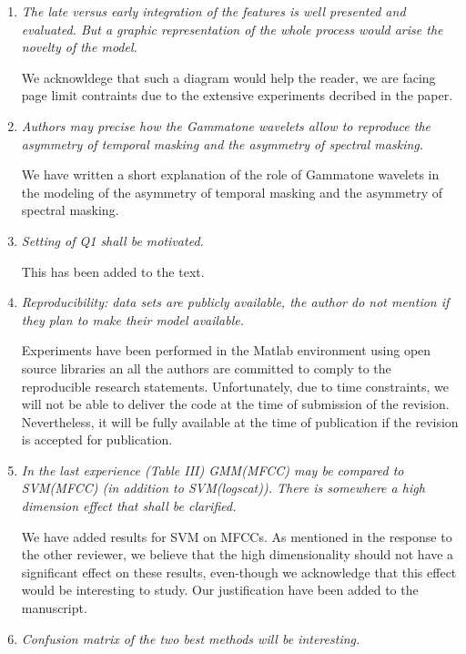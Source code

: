 \documentclass[10pt]{article}
\begin{document}
\begin{enumerate}

\item \emph{The late versus early integration of the features is well presented and evaluated. But a graphic representation of the whole process would arise the novelty of the model.}

We acknowldege that such a diagram would help the reader, we are facing page limit contraints due to the extensive experiments decribed in the paper.

\item \emph{Authors may precise how the Gammatone wavelets allow to reproduce the asymmetry of temporal masking and the asymmetry of spectral masking.}

We have written a short explanation of the role of Gammatone wavelets in the modeling of the asymmetry of temporal masking and the asymmetry of spectral masking.

\item \emph{Setting of Q1 shall be motivated.}

This has been added to the text.

\item \emph{Reproducibility:  data sets are publicly available, the author do not mention if they plan to make their model available.}

Experiments have been performed in the Matlab environment using open source libraries an all the authors are committed to comply to the reproducible research statements. Unfortunately, due to time constraints, we will not be able to deliver the code at the time of submission of the revision. Nevertheless, it will be fully available at the time of publication if the revision is accepted for publication.

\item \emph{In the last experience (Table III) GMM(MFCC) may be compared to SVM(MFCC) (in addition to SVM(logscat)). There is somewhere a high dimension effect that shall be clarified.}

We have added results for SVM on MFCCs. As mentioned in the response to the other reviewer, we believe that the high dimensionality should not have a significant effect on these results, even-though we acknowledge that this effect would be interesting to study. Our justification have been added to the manuscript.

\item \emph{Confusion matrix of the two best methods will be interesting.}


\end{enumerate}
\end{document}
